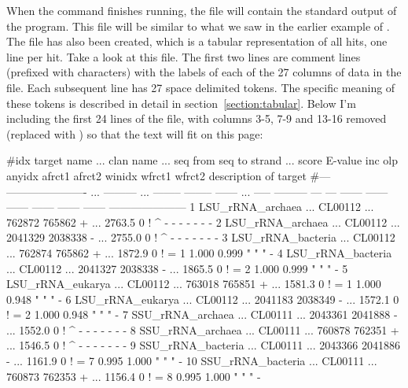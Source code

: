 When the  command finishes running, the file
 will contain the standard output of the
program. This file will be similar to what we saw in the earlier example of
. The file  has also been
created, which is a tabular representation of all hits, one line per
hit.  Take a look at this file. The first two lines are comment lines
(prefixed with \prog{\#} characters) with the labels of each of the 27
columns of data in the file. Each subsequent line has 27 space
delimited tokens. The specific meaning of these tokens is described in
detail in section~\ref{section:tabular}.  Below I'm including the
first 24 lines of the file, with columns 3-5, 7-9 and 13-16 removed
(replaced with ) so that the text will fit on this page:

\begin{tinysreoutput}
#idx target name            ... clan name ... seq from   seq to strand ... score   E-value inc olp anyidx afrct1 afrct2 winidx wfrct1 wfrct2 description of target
#--- ---------------------- ... --------- ... -------- -------- ------ ... ----- --------- --- --- ------ ------ ------ ------ ------ ------ ---------------------
1    LSU_rRNA_archaea       ... CL00112   ...  762872   765862      +  ... 2763.5         0  !   ^       -      -      -      -      -      - -
2    LSU_rRNA_archaea       ... CL00112   ... 2041329  2038338      -  ... 2755.0         0  !   ^       -      -      -      -      -      - -
3    LSU_rRNA_bacteria      ... CL00112   ...  762874   765862      +  ... 1872.9         0  !   =       1  1.000  0.999      "      "      " -
4    LSU_rRNA_bacteria      ... CL00112   ... 2041327  2038338      -  ... 1865.5         0  !   =       2  1.000  0.999      "      "      " -
5    LSU_rRNA_eukarya       ... CL00112   ...  763018   765851      +  ... 1581.3         0  !   =       1  1.000  0.948      "      "      " -
6    LSU_rRNA_eukarya       ... CL00112   ... 2041183  2038349      -  ... 1572.1         0  !   =       2  1.000  0.948      "      "      " -
7    SSU_rRNA_archaea       ... CL00111   ... 2043361  2041888      -  ... 1552.0         0  !   ^       -      -      -      -      -      - -
8    SSU_rRNA_archaea       ... CL00111   ...  760878   762351      +  ... 1546.5         0  !   ^       -      -      -      -      -      - -
9    SSU_rRNA_bacteria      ... CL00111   ... 2043366  2041886      -  ... 1161.9         0  !   =       7  0.995  1.000      "      "      " -
10   SSU_rRNA_bacteria      ... CL00111   ...  760873   762353      +  ... 1156.4         0  !   =       8  0.995  1.000      "      "      " -

\end{tinysreoutput}
